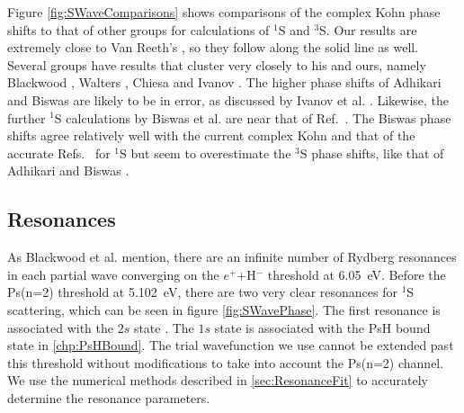 \documentclass[Dissertation.tex]{subfiles}
\begin{document}
Figure \ref{fig:SWaveComparisons} shows comparisons of the complex Kohn phase shifts to that of other groups for calculations of $^1$S and $^3$S. Our results are extremely close to Van Reeth's \cite{VanReeth2003}, so they follow along the solid line as well. Several groups have results that cluster very closely to his and ours, namely Blackwood \cite{Blackwood2002}, Walters \cite{Walters2004}, Chiesa \cite{Chiesa2002} and Ivanov \cite{Ivanov2002}. The higher phase shifts of Adhikari and Biswas \cite{Adhikari1999} are likely to be in error, as discussed by Ivanov et al. \cite{Ivanov2002}. Likewise, the further $^1$S calculations by Biswas et al. \cite{Biswas2002a} are near that of Ref.~\cite{Adhikari1999}. The Biswas \cite{Biswas2001} phase shifts agree relatively well with the current complex Kohn and that of the accurate Refs.~\cite{Blackwood2002,VanReeth2003,Walters2004} for $^1$S but seem to overestimate the $^3$S phase shifts, like that of Adhikari and Biswas \cite{Adhikari1999}.



\subsection{Resonances}
\label{sec:SWaveResonances}

As Blackwood et al. \cite{Blackwood2002} mention, there are an infinite number of Rydberg resonances in each partial wave converging on the $e^+$+H$^-$ threshold at \SI{6.05}{eV}. Before the Ps(n=2) threshold at \SI{5.102}{eV}, there are two very clear resonances for $^1$S scattering, which can be seen in figure \ref{fig:SWavePhase}. The first resonance is associated with the $2s$ state \cite{DiRienzi2002b}. The $1s$ state is associated with the PsH bound state in \cref{chp:PsHBound}. The trial wavefunction we use cannot be extended past this threshold without modifications to take into account the Ps(n=2) channel. We use the numerical methods described in \cref{sec:ResonanceFit} to accurately determine the resonance parameters.
\end{document}

